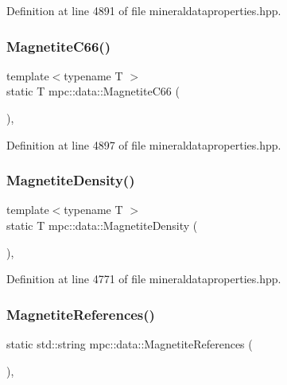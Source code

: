 Definition at line 4891 of file mineraldataproperties.\+hpp.

\mbox{\label{namespacempc_1_1data_a25f06736932c21de684ed2f5126f2ab6}} 
\subsubsection{\texorpdfstring{Magnetite\+C66()}{MagnetiteC66()}}
{\footnotesize\ttfamily template$<$typename T $>$ \\
static T mpc\+::data\+::\+Magnetite\+C66 (\begin{DoxyParamCaption}{ }\end{DoxyParamCaption})\hspace{0.3cm}{\ttfamily [inline]}, {\ttfamily [static]}}



Definition at line 4897 of file mineraldataproperties.\+hpp.

\mbox{\label{namespacempc_1_1data_a05bbeeb11aed90d874cb320243548b71}} 
\subsubsection{\texorpdfstring{Magnetite\+Density()}{MagnetiteDensity()}}
{\footnotesize\ttfamily template$<$typename T $>$ \\
static T mpc\+::data\+::\+Magnetite\+Density (\begin{DoxyParamCaption}{ }\end{DoxyParamCaption})\hspace{0.3cm}{\ttfamily [inline]}, {\ttfamily [static]}}



Definition at line 4771 of file mineraldataproperties.\+hpp.

\mbox{\label{namespacempc_1_1data_a4fdb455ebe0b37cdb5970d7463c4e4fb}} 
\subsubsection{\texorpdfstring{Magnetite\+References()}{MagnetiteReferences()}}
{\footnotesize\ttfamily static std\+::string mpc\+::data\+::\+Magnetite\+References (\begin{DoxyParamCaption}{ }\end{DoxyParamCaption})\hspace{0.3cm}{\ttfamily [inline]}, {\ttfamily [static]}}



